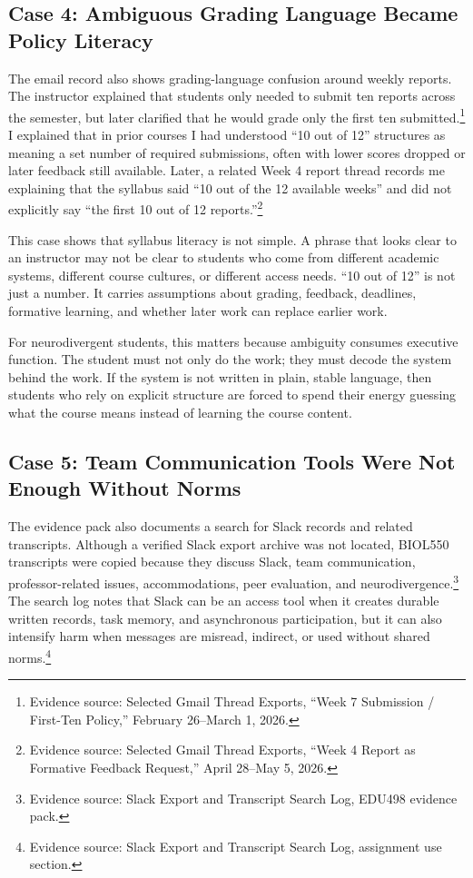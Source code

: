 \documentclass[12pt]{article}
\begin{document}
\subsection*{Case 4: Ambiguous Grading Language Became Policy Literacy}

The email record also shows grading-language confusion around weekly reports. The instructor explained that students only needed to submit ten reports across the semester, but later clarified that he would grade only the first ten submitted.\footnote{Evidence source: Selected Gmail Thread Exports, ``Week 7 Submission / First-Ten Policy,'' February 26--March 1, 2026.} I explained that in prior courses I had understood ``10 out of 12'' structures as meaning a set number of required submissions, often with lower scores dropped or later feedback still available. Later, a related Week 4 report thread records me explaining that the syllabus said ``10 out of the 12 available weeks'' and did not explicitly say ``the first 10 out of 12 reports.''\footnote{Evidence source: Selected Gmail Thread Exports, ``Week 4 Report as Formative Feedback Request,'' April 28--May 5, 2026.}

This case shows that syllabus literacy is not simple. A phrase that looks clear to an instructor may not be clear to students who come from different academic systems, different course cultures, or different access needs. ``10 out of 12'' is not just a number. It carries assumptions about grading, feedback, deadlines, formative learning, and whether later work can replace earlier work.

For neurodivergent students, this matters because ambiguity consumes executive function. The student must not only do the work; they must decode the system behind the work. If the system is not written in plain, stable language, then students who rely on explicit structure are forced to spend their energy guessing what the course means instead of learning the course content.

\subsection*{Case 5: Team Communication Tools Were Not Enough Without Norms}

The evidence pack also documents a search for Slack records and related transcripts. Although a verified Slack export archive was not located, BIOL550 transcripts were copied because they discuss Slack, team communication, professor-related issues, accommodations, peer evaluation, and neurodivergence.\footnote{Evidence source: Slack Export and Transcript Search Log, EDU498 evidence pack.} The search log notes that Slack can be an access tool when it creates durable written records, task memory, and asynchronous participation, but it can also intensify harm when messages are misread, indirect, or used without shared norms.\footnote{Evidence source: Slack Export and Transcript Search Log, assignment use section.}
\end{document}

